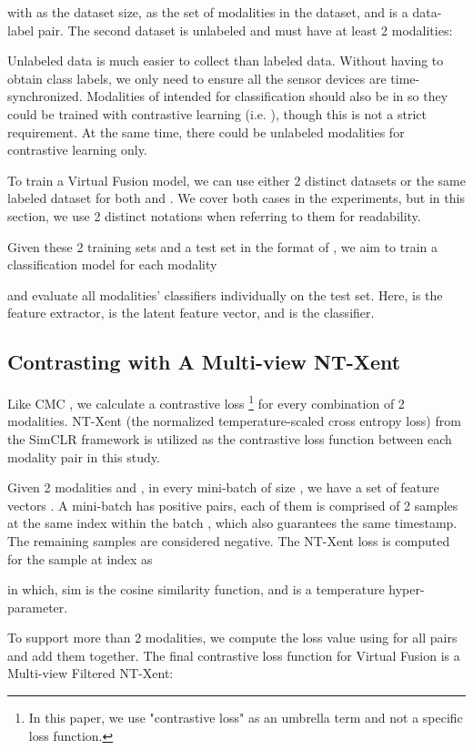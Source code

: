 \documentclass[conference]{IEEEtran}
\begin{document}
with  as the dataset size,  as the set of modalities in the dataset, and  is a data-label pair. The second dataset is unlabeled and must have at least 2 modalities:

Unlabeled data is much easier to collect than labeled data. Without having to obtain class labels, we only need to ensure all the sensor devices are time-synchronized. Modalities of  intended for classification should also be in  so they could be trained with contrastive learning (i.e. ), though this is not a strict requirement. At the same time, there could be unlabeled modalities for contrastive learning only.

To train a Virtual Fusion model, we can use either 2 distinct datasets or the same labeled dataset for both  and . We cover both cases in the experiments, but in this section, we use 2 distinct notations when referring to them for readability.

Given these 2 training sets and a test set in the format of , we aim to train a classification model for each modality

and evaluate all modalities' classifiers individually on the test set. Here,  is the feature extractor,  is the latent feature vector, and  is the classifier.

\subsection{Contrasting with A Multi-view NT-Xent}
Like CMC \cite{Tian2019}, we calculate a contrastive loss \footnote{In this paper, we use "contrastive loss" as an umbrella term and not a specific loss function.} for every combination of 2 modalities. NT-Xent (the normalized temperature-scaled cross entropy loss) from the SimCLR framework \cite{Chen2020} is utilized as the contrastive loss function between each modality pair in this study.

Given 2 modalities  and , in every mini-batch of size , we have a set of feature vectors . A mini-batch has  positive pairs, each of them is comprised of 2 samples at the same index  within the batch , which also guarantees the same timestamp. The remaining  samples are considered negative. The NT-Xent loss is computed for the sample at index  as

in which, sim is the cosine similarity function, and  is a temperature hyper-parameter.



To support more than 2 modalities, we compute the loss value using  for all pairs and add them together. The final contrastive loss function for Virtual Fusion is a Multi-view Filtered NT-Xent:
\end{document}
